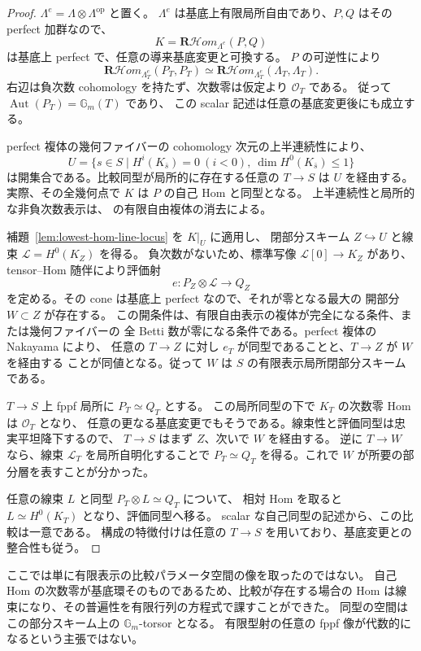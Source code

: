 \begin{proof}
$\Lambda^e=\Lambda\otimes\Lambda^{\mathrm{op}}$ と置く。
$\Lambda^e$ は基底上有限局所自由であり、$P,Q$ はその perfect 加群なので、
\[
 K=\mathbf R\mathcal Hom_{\Lambda^e}(P,Q)
\]
は基底上 perfect で、任意の導来基底変更と可換する。
$P$ の可逆性により
\[
 \mathbf R\mathcal Hom_{\Lambda_T^e}(P_T,P_T)
 \simeq
 \mathbf R\mathcal Hom_{\Lambda_T^e}(\Lambda_T,\Lambda_T).
\]
右辺は負次数 cohomology を持たず、次数零は仮定より $\mathcal O_T$ である。
従って $\operatorname{Aut}(P_T)=\mathbb G_m(T)$ であり、
この scalar 記述は任意の基底変更後にも成立する。

perfect 複体の幾何ファイバーの cohomology 次元の上半連続性により、
\[
 U=\{s\in S\mid H^i(K_{\bar s})=0\ (i<0),\ 
                      \dim H^0(K_{\bar s})\le1\}
\]
は開集合である。比較同型が局所的に存在する任意の $T\to S$ は
$U$ を経由する。実際、その全幾何点で $K$ は $P$ の自己 Hom と同型となる。
上半連続性と局所的な非負次数表示は、\cite[Tag 0BDH, Lemma 36.31.1]{StacksModuli}
の有限自由複体の消去による。

補題~\ref{lem:lowest-hom-line-locus} を $K|_U$ に適用し、
閉部分スキーム $Z\hookrightarrow U$ と線束
$\mathcal L=H^0(K_Z)$ を得る。
負次数がないため、標準写像 $\mathcal L[0]\to K_Z$ があり、
tensor--Hom 随伴により評価射
\[
 e:P_Z\otimes\mathcal L\longrightarrow Q_Z
\]
を定める。その cone は基底上 perfect なので、それが零となる最大の
開部分 $W\subset Z$ が存在する。
この開条件は、有限自由表示の複体が完全になる条件、または幾何ファイバーの
全 Betti 数が零になる条件である。perfect 複体の Nakayama により、
任意の $T\to Z$ に対し $e_T$ が同型であることと、$T\to Z$ が $W$ を経由する
ことが同値となる。従って $W$ は $S$ の有限表示局所閉部分スキームである。

$T\to S$ 上 fppf 局所に $P_T\simeq Q_T$ とする。
この局所同型の下で $K_T$ の次数零 Hom は $\mathcal O_T$ となり、
任意の更なる基底変更でもそうである。線束性と評価同型は忠実平坦降下するので、
$T\to S$ はまず $Z$、次いで $W$ を経由する。
逆に $T\to W$ なら、線束 $\mathcal L_T$ を局所自明化することで
$P_T\simeq Q_T$ を得る。これで $W$ が所要の部分層を表すことが分かった。

任意の線束 $L$ と同型 $P_T\otimes L\simeq Q_T$ について、
相対 Hom を取ると $L\simeq H^0(K_T)$ となり、評価同型へ移る。
scalar な自己同型の記述から、この比較は一意である。
構成の特徴付けは任意の $T\to S$ を用いており、基底変更との整合性も従う。
\end{proof}

\begin{remark}
ここでは単に有限表示の比較パラメータ空間の像を取ったのではない。
自己 Hom の次数零が基底環そのものであるため、比較が存在する場合の
Hom は線束になり、その普遍性を有限行列の方程式で課すことができた。
同型の空間はこの部分スキーム上の $\mathbb G_m$-torsor となる。
有限型射の任意の fppf 像が代数的になるという主張ではない。
\end{remark}

